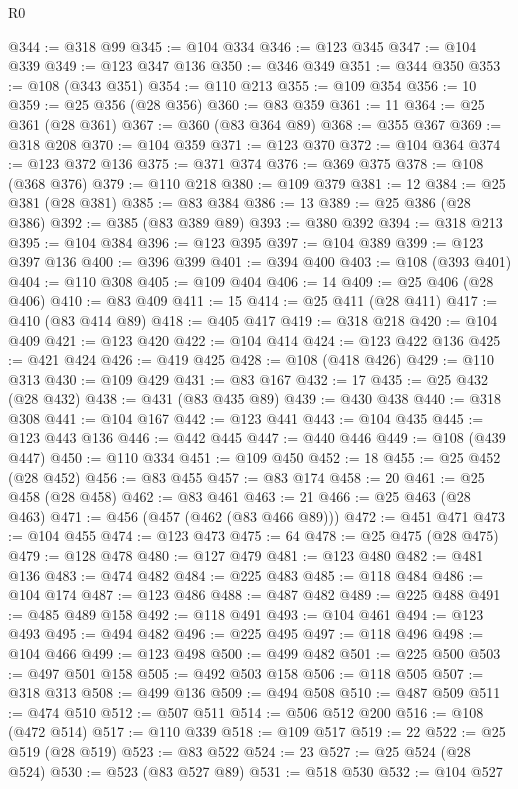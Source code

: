 \begin{lexlean}{R0}
\begin{coremodule}
@344 := @318 @99
@345 := @104 @334
@346 := @123 @345
@347 := @104 @339
@349 := @123 @347 @136
@350 := @346 @349
@351 := @344 @350
@353 := @108 (@343 @351)
@354 := @110 @213
@355 := @109 @354
@356 := 10
@359 := @25 @356 (@28 @356)
@360 := @83 @359
@361 := 11
@364 := @25 @361 (@28 @361)
@367 := @360 (@83 @364 @89)
@368 := @355 @367
@369 := @318 @208
@370 := @104 @359
@371 := @123 @370
@372 := @104 @364
@374 := @123 @372 @136
@375 := @371 @374
@376 := @369 @375
@378 := @108 (@368 @376)
@379 := @110 @218
@380 := @109 @379
@381 := 12
@384 := @25 @381 (@28 @381)
@385 := @83 @384
@386 := 13
@389 := @25 @386 (@28 @386)
@392 := @385 (@83 @389 @89)
@393 := @380 @392
@394 := @318 @213
@395 := @104 @384
@396 := @123 @395
@397 := @104 @389
@399 := @123 @397 @136
@400 := @396 @399
@401 := @394 @400
@403 := @108 (@393 @401)
@404 := @110 @308
@405 := @109 @404
@406 := 14
@409 := @25 @406 (@28 @406)
@410 := @83 @409
@411 := 15
@414 := @25 @411 (@28 @411)
@417 := @410 (@83 @414 @89)
@418 := @405 @417
@419 := @318 @218
@420 := @104 @409
@421 := @123 @420
@422 := @104 @414
@424 := @123 @422 @136
@425 := @421 @424
@426 := @419 @425
@428 := @108 (@418 @426)
@429 := @110 @313
@430 := @109 @429
@431 := @83 @167
@432 := 17
@435 := @25 @432 (@28 @432)
@438 := @431 (@83 @435 @89)
@439 := @430 @438
@440 := @318 @308
@441 := @104 @167
@442 := @123 @441
@443 := @104 @435
@445 := @123 @443 @136
@446 := @442 @445
@447 := @440 @446
@449 := @108 (@439 @447)
@450 := @110 @334
@451 := @109 @450
@452 := 18
@455 := @25 @452 (@28 @452)
@456 := @83 @455
@457 := @83 @174
@458 := 20
@461 := @25 @458 (@28 @458)
@462 := @83 @461
@463 := 21
@466 := @25 @463 (@28 @463)
@471 := @456 (@457 (@462 (@83 @466 @89)))
@472 := @451 @471
@473 := @104 @455
@474 := @123 @473
@475 := 64
@478 := @25 @475 (@28 @475)
@479 := @128 @478
@480 := @127 @479
@481 := @123 @480
@482 := @481 @136
@483 := @474 @482
@484 := @225 @483
@485 := @118 @484
@486 := @104 @174
@487 := @123 @486
@488 := @487 @482
@489 := @225 @488
@491 := @485 @489 @158
@492 := @118 @491
@493 := @104 @461
@494 := @123 @493
@495 := @494 @482
@496 := @225 @495
@497 := @118 @496
@498 := @104 @466
@499 := @123 @498
@500 := @499 @482
@501 := @225 @500
@503 := @497 @501 @158
@505 := @492 @503 @158
@506 := @118 @505
@507 := @318 @313
@508 := @499 @136
@509 := @494 @508
@510 := @487 @509
@511 := @474 @510
@512 := @507 @511
@514 := @506 @512 @200
@516 := @108 (@472 @514)
@517 := @110 @339
@518 := @109 @517
@519 := 22
@522 := @25 @519 (@28 @519)
@523 := @83 @522
@524 := 23
@527 := @25 @524 (@28 @524)
@530 := @523 (@83 @527 @89)
@531 := @518 @530
@532 := @104 @527

\end{coremodule}
\end{lexlean}
